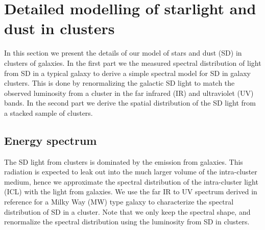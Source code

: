 \documentclass[10pt,aps,pra,reprint,amsmath,amsfonts,amssymb,showpacs,nofootinbib,floatfix]{revtex4-1}
\begin{document}
%


\vspace{-0.7cm}

%
%

\appendix

\section{Detailed modelling of starlight and dust in clusters}
\label{sect:SD}
In this section we present the details of our model of stars and dust
(SD) in clusters of galaxies. In the first part we the measured
spectral distribution of light from SD in a typical galaxy to derive a
simple spectral model for SD in galaxy clusters. This is done by
renormalizing the galactic SD light to match the observed luminosity
from a cluster in the far infrared (IR) and ultraviolet (UV) bands. In
the second part we derive the spatial distribution of the SD light
from a stacked sample of clusters.

\subsection{Energy spectrum}
The SD light from clusters is dominated by the emission from
galaxies. This radiation is expected to leak out into the much larger
volume of the intra-cluster medium, hence we approximate the spectral
distribution of the intra-cluster light (ICL) with the light from
galaxies. We use the far IR to UV spectrum derived in reference
\cite{2006ApJ...648L..29P} for a Milky Way (MW) type galaxy to
characterize the spectral distribution of SD in a cluster. Note that
we only keep the spectral shape, and renormalize the spectral
distribution using the luminosity from SD in clusters.
\end{document}

